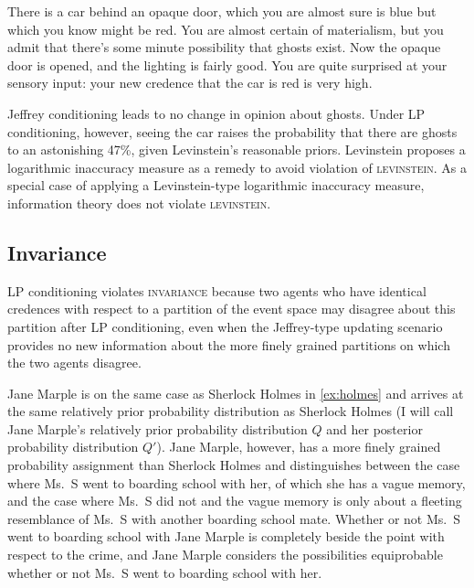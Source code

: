 \documentclass[11pt]{article}
\begin{document}
\begin{quotex}
  \label{ex:levinstein} There is a car
  behind an opaque door, which you are almost sure is blue but which
  you know might be red. You are almost certain of materialism, but
  you admit that there's some minute possibility that ghosts exist.
  Now the opaque door is opened, and the lighting is fairly good. You
  are quite surprised at your sensory input: your new credence that
  the car is red is very high.
\end{quotex}

Jeffrey conditioning leads to no change in opinion about ghosts. Under
LP conditioning, however, seeing the car raises the probability that
there are ghosts to an astonishing 47\%, given Levinstein's reasonable
priors. Levinstein proposes a logarithmic inaccuracy measure as a
remedy to avoid violation of \textsc{levinstein}. As a special case of
applying a Levinstein-type logarithmic inaccuracy measure, information
theory does not violate \textsc{levinstein}.

\subsection{Invariance}
\label{Invariance}

LP conditioning violates \textsc{invariance} because two agents who
have identical credences with respect to a partition of the event
space may disagree about this partition after LP conditioning, even
when the Jeffrey-type updating scenario provides no new information
about the more finely grained partitions on which the two agents
disagree. 

\begin{quotex}
  \label{ex:marple} Jane Marple is on the same
  case as Sherlock Holmes in {\xample} \ref{ex:holmes} and arrives at
  the same relatively prior probability distribution as Sherlock
  Holmes (I will call Jane Marple's relatively prior probability
  distribution $Q$ and her posterior probability distribution $Q'$).
  Jane Marple, however, has a more finely grained probability
  assignment than Sherlock Holmes and distinguishes between the case
  where Ms.\ S went to boarding school with her, of which she has a
  vague memory, and the case where Ms.\ S did not and the vague memory
  is only about a fleeting resemblance of Ms.\ S with another boarding
  school mate. Whether or not Ms.\ S went to boarding school with Jane
  Marple is completely beside the point with respect to the crime, and
  Jane Marple considers the possibilities equiprobable whether or not
  Ms.\ S went to boarding school with her.
\end{quotex}
\end{document}
